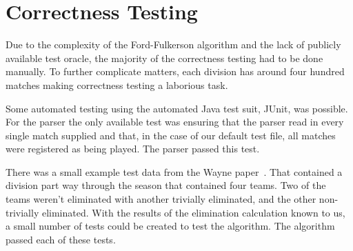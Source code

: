\section{Correctness Testing}

Due to the complexity of the Ford-Fulkerson algorithm and the lack of
publicly available test oracle, the majority of the correctness testing had to
be done manually. To further complicate matters, each division has around four
hundred matches making correctness testing a laborious task.

Some automated testing using the automated Java test suit, JUnit, was possible.
For the parser the only available test was ensuring that the parser read in
every single match supplied and that, in the case of our default test file,
all matches were registered as being played. The parser passed this test.

There was a small example test data from the Wayne paper~\cite{Wayne}. That
contained a division part way through the season that contained four teams.
Two of the teams weren't eliminated with another trivially eliminated, and the
other non-trivially eliminated. With the results of the elimination calculation
known to us, a small number of tests could be created to test the algorithm.
The algorithm passed each of these tests.